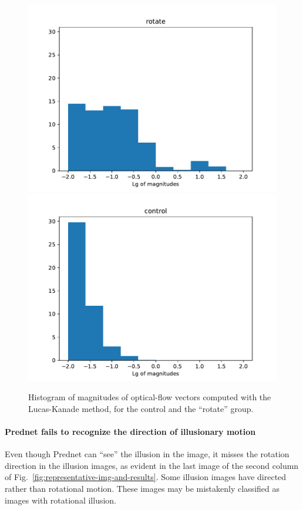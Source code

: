 \documentclass[journal]{IEEEtran}
\begin{document}
\begin{figure}[t]
  \centering
  \includegraphics[width=\linewidth]{fig/flow-mag-plot-rotate.pdf}
  \includegraphics[width=\linewidth]{fig/flow-mag-plot-control.pdf}
  \caption{Histogram of magnitudes of optical-flow vectors computed with the Lucas-Kanade method, for the control and the ``rotate'' group.}
  \label{fig:histogram-of-magnitudes}
\end{figure}

\paragraph{Prednet fails to recognize the direction of illusionary motion} Even though Prednet can ``see'' the illusion in the image, it misses the rotation direction in the illusion images, as evident in the last image of the second column of Fig.~\ref{fig:representative-img-and-results}. Some illusion images have directed rather than rotational motion. These images may be mistakenly classified as images with rotational illusion.
\end{document}
